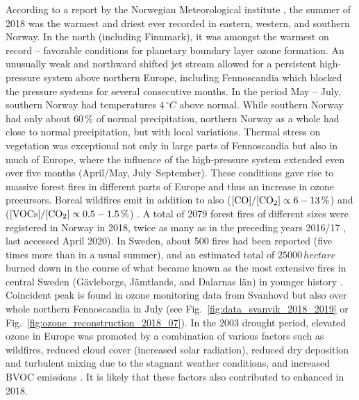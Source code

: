 \documentclass[bg, manuscript]{copernicus}
\begin{document}
According to a report by the Norwegian Meteorological institute \citep{MetNOR2019}, the summer of 2018 was the warmest and driest ever recorded in eastern, western, and southern Norway. In the north (including Finnmark), it was amongst the warmest on record -- favorable conditions for planetary boundary layer ozone formation.
An unusually weak and northward shifted jet stream allowed for a persistent high-pressure system above northern Europe, including Fennoscandia which blocked the pressure systems for several consecutive months. In the period May -- July, southern Norway had temperatures $4\,\unit{^\circ C}$ above normal. While southern Norway had only about $60\,\unit{\%}$ of normal precipitation, northern Norway as a whole had close to normal precipitation, but with local variations.
Thermal stress on vegetation was exceptional not only in large parts of Fennoscandia but also in much of Europe, where the influence of the high-pressure system extended even over five months (April/May, July--September). These conditions gave rise to massive forest fires in different parts of Europe and thus an increase in ozone precursors. Boreal wildfires emit in addition to  also  ($\chem{[CO]}/\chem{[CO_2]} \propto 6-13\,\unit{\%}$) and  ($\chem{[VOCs]}/\chem{[CO_2]} \propto 0.5-1.5\,\unit{\%}$) \citep{AE:Cofer1990}.
A total of 2079 forest fires of different sizes were registered in Norway in 2018, twice as many as in the preceding years 2016/17 \citep{DSB2019}, last accessed April 2020). In Sweden, about 500 fires had been reported (five times more than in a usual summer), and an estimated total of $25000\,\unit{hectare}$ burned down in the course of what became known as the most extensive fires in central Sweden (G\"{a}vleborgs, J\"{a}mtlands, and Dalarnas l\"{a}n) in younger history \citep{SOU2019}. Coincident peak \chem{[O_3]} is found in ozone monitoring data from Svanhovd but also over whole northern Fennoscandia in July (see Fig.~\ref{fig:data_svanvik_2018_2019} or Fig.~\ref{fig:ozone_reconstruction_2018_07}).
In the 2003 drought period, elevated ozone in Europe was promoted by a combination of various factors such as wildfires, reduced cloud cover (increased solar radiation), reduced dry deposition and turbulent mixing due to the stagnant weather conditions, and increased BVOC emissions \citep{JGR:Solberg2018}. It is likely that these factors also contributed to enhanced \chem{[O_3]} in 2018.
\end{document}
